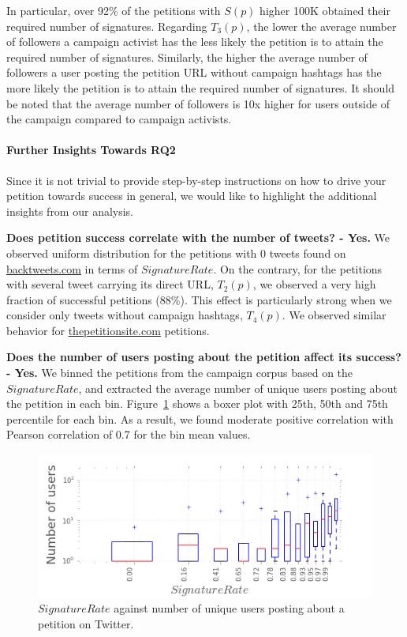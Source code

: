 In particular, over 92\% of the petitions with $S(p)$ higher 100K obtained their required number of signatures.
Regarding $T_3(p)$, the lower the average number of followers a campaign activist has the less likely the petition is to attain the required number of signatures.
Similarly, the higher the average number of followers a user posting the petition URL without campaign hashtags has the more likely the petition is to attain the required number of signatures.
It should be noted that the average number of followers is 10x higher for users outside of the campaign compared to campaign activists. 

\paragraph{Further Insights Towards RQ2}
Since it is not trivial to provide step-by-step instructions on how to drive your petition towards success in general, we would like to highlight the additional insights from our analysis.


\textbf{Does petition success correlate with the number of tweets? - Yes.} We observed uniform distribution for the petitions with 0 tweets found on \url{backtweets.com} in terms of $SignatureRate$. On the contrary, for the petitions with several tweet carrying its direct URL, $T_2(p)$, we observed a very high fraction of successful petitions (88\%). This effect is particularly strong when we consider only tweets without campaign hashtags, $T_4(p)$. We observed similar behavior for \url{thepetitionsite.com} petitions.

\textbf{Does the number of users posting about the petition affect its success? - Yes.} We binned the petitions from the campaign corpus based on the $SignatureRate$, and extracted the average number of unique users posting about the petition in each bin. Figure~\ref{fig:signatures_vs_users} shows a boxer plot with 25th, 50th and 75th percentile for each bin. As a result, we found moderate positive correlation with Pearson correlation of 0.7 for the bin mean values.

\begin{figure}
\centering
\includegraphics[scale=0.48]{figures/signaturesgoalVSnumusersCampaigns.png}
\caption{$SignatureRate$ against number of unique users posting about a petition on Twitter.}
\label{fig:signatures_vs_users}
\end{figure}

